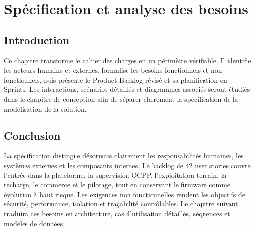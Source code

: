 \chapter{Spécification et analyse des besoins}

\section*{Introduction}
Ce chapitre transforme le cahier des charges en un périmètre vérifiable. Il identifie
les acteurs humains et externes, formalise les besoins fonctionnels et non
fonctionnels, puis présente le Product Backlog révisé et sa planification en Sprints.
Les interactions, scénarios détaillés et diagrammes associés seront étudiés dans le
chapitre de conception afin de séparer clairement la spécification de la modélisation
de la solution.




\section*{Conclusion}
La spécification distingue désormais clairement les responsabilités humaines, les
systèmes externes et les composants internes. Le backlog de 42 user stories couvre
l'entrée dans la plateforme, la supervision OCPP, l'exploitation terrain, la recharge,
le commerce et le pilotage, tout en conservant le firmware comme évolution à haut
risque. Les exigences non fonctionnelles rendent les objectifs de sécurité,
performance, isolation et traçabilité contrôlables. Le chapitre suivant traduira ces
besoins en architecture, cas d'utilisation détaillés, séquences et modèles de données.
